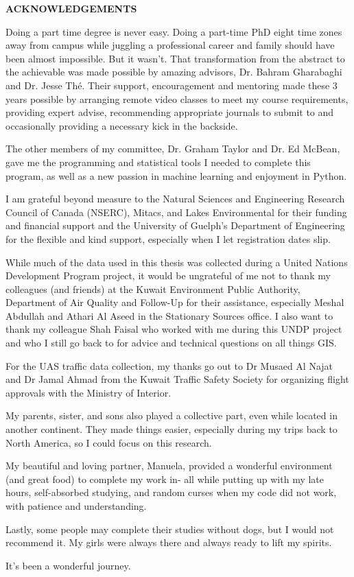\clearpage
\begin{centering}
\textbf{ACKNOWLEDGEMENTS}\\
\vspace{\baselineskip}
\end{centering}
Doing a part time degree is never easy. Doing a part-time PhD eight time zones away from campus while juggling a professional career and family should have been almost impossible. But it wasn't. That transformation from the abstract to the achievable was made possible by amazing advisors, Dr. Bahram Gharabaghi and Dr. Jesse Th\'e. Their support, encouragement and mentoring made these 3 years possible by arranging remote video classes to meet my course requirements, providing expert advise, recommending appropriate journals to submit to and occasionally providing a necessary kick in the backside.

The other members of my committee, Dr. Graham Taylor and Dr. Ed McBean, gave me the programming and statistical tools I needed to complete this program, as well as a new passion in machine learning and enjoyment in Python.

I am grateful beyond measure to the Natural Sciences and Engineering Research Council of Canada (NSERC), Mitacs, and Lakes Environmental for their funding and financial support and the University of Guelph's Department of Engineering for the flexible and kind support, especially when I let registration dates slip.

While much of the data used in this thesis was collected during a United Nations Development Program project, it would be ungrateful of me not to thank my colleagues (and friends) at the Kuwait Environment Public Authority, Department of Air Quality and Follow-Up for their assistance, especially Meshal Abdullah and Athari Al Aseed in the Stationary Sources office. I also want to thank my colleague Shah Faisal who worked with me during this UNDP project and who I still go back to for advice and technical questions on all things GIS.

For the UAS traffic data collection, my thanks go out to Dr Musaed Al Najat and Dr Jamal Ahmad from the Kuwait Traffic Safety Society for organizing flight approvals with the Ministry of Interior.

My parents, sister, and sons also played a collective part, even while located in another continent. They made things easier, especially during my trips back to North America, so I could focus on this research. 

My beautiful and loving partner, Manuela, provided a wonderful environment (and great food) to complete my work in- all while putting up with my late hours, self-absorbed studying, and random curses when my code did not work, with patience and understanding.

Lastly, some people may complete their studies without dogs, but I would not recommend it. My girls were always there and always ready to lift my spirits.

It's been a wonderful journey.





\clearpage




